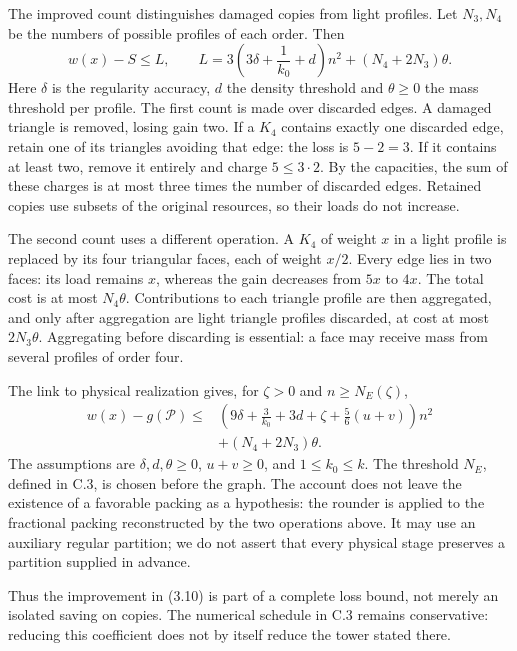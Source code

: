 \documentclass[english,11pt,a4paper]{article}
\begin{document}
The improved count distinguishes damaged copies from light profiles. Let \(N_3,N_4\) be the numbers of possible profiles of each order. Then \[
w(x)-S\le L,\qquad
L=3\left(3\delta+\frac1{k_0}+d\right)n^2
  +(N_4+2N_3)\theta.
\tag{3.10}
\] Here \(\delta\) is the regularity accuracy, \(d\) the density threshold and \(\theta\ge0\) the mass threshold per profile. The first count is made over discarded edges. A damaged triangle is removed, losing gain two. If a \(K_4\) contains exactly one discarded edge, retain one of its triangles avoiding that edge: the loss is \(5-2=3\). If it contains at least two, remove it entirely and charge \(5\le3\cdot2\). By the capacities, the sum of these charges is at most three times the number of discarded edges. Retained copies use subsets of the original resources, so their loads do not increase.

The second count uses a different operation. A \(K_4\) of weight \(x\) in a light profile is replaced by its four triangular faces, each of weight \(x/2\). Every edge lies in two faces: its load remains \(x\), whereas the gain decreases from \(5x\) to \(4x\). The total cost is at most \(N_4\theta\). Contributions to each triangle profile are then aggregated, and only after aggregation are light triangle profiles discarded, at cost at most \(2N_3\theta\). Aggregating before discarding is essential: a face may receive mass from several profiles of order four.

The link to physical realization gives, for \(\zeta>0\) and \(n\ge N_E(\zeta)\), \[
\begin{aligned}
w(x)-g(\mathcal P)\le{}&
\left(9\delta+\frac3{k_0}+3d+\zeta
             +\frac56(u+v)\right)n^2\\
&+(N_4+2N_3)\theta .
\end{aligned}
\tag{3.11}
\] The assumptions are \(\delta,d,\theta\ge0\), \(u+v\ge0\), and \(1\le k_0\le k\). The threshold \(N_E\), defined in C.3, is chosen before the graph. The account does not leave the existence of a favorable packing as a hypothesis: the rounder is applied to the fractional packing reconstructed by the two operations above. It may use an auxiliary regular partition; we do not assert that every physical stage preserves a partition supplied in advance.

Thus the improvement in (3.10) is part of a complete loss bound, not merely an isolated saving on copies. The numerical schedule in C.3 remains conservative: reducing this coefficient does not by itself reduce the tower stated there.
\end{document}
